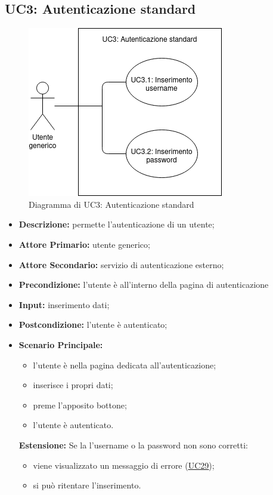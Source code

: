 \subsection{UC3: Autenticazione standard}
\begin{figure}[!ht]
    \caption{Diagramma di UC3: Autenticazione standard}
    \vspace{10px}
    \includegraphics[scale=0.5]{../../../Images/AnalisiRequisiti/UC03}
    \centering
\end{figure}
\label{sec:UC3}
\begin{itemize}
    \item \textbf{Descrizione:} permette l'autenticazione di un utente;
    \item \textbf{Attore Primario:} utente generico;
    \item \textbf{Attore Secondario:} servizio di autenticazione esterno;
    \item \textbf{Precondizione:} l'utente è all'interno della pagina di autenticazione
    \item \textbf{Input:} inserimento dati;
    \item \textbf{Postcondizione:} l'utente è autenticato;
    \item \textbf{Scenario Principale:} 
    \begin{itemize}
        \item l'utente è nella pagina dedicata all'autenticazione;
        \item inserisce i propri dati;
        \item preme l'apposito bottone;
        \item l'utente è autenticato.
    \end{itemize}
    \textbf{Estensione:}
        Se la l'username o la password non sono corretti:
        \begin{itemize}
            \item viene visualizzato un messaggio di errore (\hyperref[sec:UC29]{\underline{UC29}});
            \item si può ritentare l'inserimento.
        \end{itemize}
\end{itemize}
